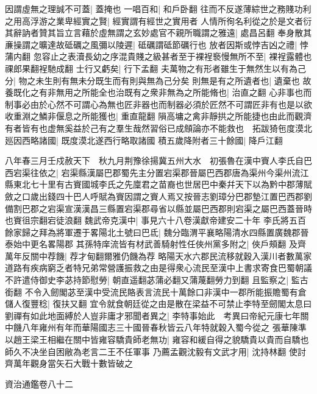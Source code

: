因謂虛無之理誠不可蓋|{
	蓋掩也}
一唱百和|{
	和戶卧翻}
往而不反遂薄綜世之務賤功利之用高浮游之業卑經實之賢|{
	經實謂有經世之實用者}
人情所徇名利從之於是文者衍其辭訥者贊其旨立言藉於虛無謂之玄妙處官不親所職謂之雅遠|{
	處昌呂翻}
奉身散其亷操謂之曠達故砥礪之風彌以陵遲|{
	砥礪謂砥節礪行也}
放者因斯或悖吉凶之禮|{
	悖蒲内翻}
忽容止之表瀆長幼之序混貴賤之級甚者至于裸裎䙝慢無所不至|{
	裸裎露體也祼郎果翻裎馳成翻}
士行又虧矣|{
	行下孟翻}
夫萬物之有形者雖生于無然生以有為己分|{
	物之未生則有無未分既生而有則與無為己分矣}
則無是有之所遺者也|{
	遺棄也}
故養既化之有非無用之所能全也治既有之衆非無為之所能脩也|{
	治直之翻}
心非事也而制事必由於心然不可謂心為無也匠非器也而制器必須於匠然不可謂匠非有也是以欲收重淵之鱗非偃息之所能獲也|{
	重直龍翻}
隕高墉之禽非靜拱之所能捷也由此而觀濟有者皆有也虚無奚益於己有之羣生哉然習俗已成頠論亦不能救也　拓跋猗㐌度漠北廵因西略諸國|{
	既度漠北遂西行略取諸國}
積五歲降附者三十餘國|{
	降戶江翻}


八年春三月壬戍赦天下　秋九月荆豫徐揚冀五州大水　初張魯在漢中賨人李氏自巴西宕渠往依之|{
	宕渠縣漢屬巴郡蜀先主分置宕渠郡晉屬巴西郡唐為渠州今渠州流江縣東北七十里有古賨國城李氏之先廩君之苗裔也世居巴中秦幷天下以為黔中郡薄賦斂之口歲出錢四十巴人呼賦為賨因謂之賨人焉又按晉志劉璋分巴郡墊江置巴西郡劉備割巴郡之宕渠宣漢漢昌三縣置宕渠郡尋省以縣並屬巴西郡則宕渠之屬巴西蓋晉時也賨徂宗翻宕徒浪翻}
魏武帝克漢中|{
	事見六十八卷漢獻帝建安二十年}
李氏將五百餘家歸之拜為將軍遷于畧陽北土號曰巴氐|{
	魏分臨渭平襄略陽清水四縣置廣魏郡晉泰始中更名畧陽郡}
其孫特庠流皆有材武善騎射性任俠州黨多附之|{
	俠戶頰翻}
及齊萬年反關中荐饑|{
	荐才甸翻爾雅仍饑為荐}
略陽天水六郡民流移就穀入漢川者數萬家道路有疾病窮乏者特兄弟常營護振救之由是得衆心流民至漢中上書求寄食巴蜀朝議不許遣侍御史李苾持節慰勞|{
	朝直遥翻苾蒲必翻又蒲蔑翻勞力到翻}
且監察之|{
	監古銜翻}
不令入劒閣苾至漢中受流民賂表言流民十萬餘口非漢中一郡所能振贍蜀有倉儲人復豐稔|{
	復扶又翻}
宜令就食朝廷從之由是散在梁益不可禁止李特至劒閣太息曰劉禪有如此地面縛於人豈非庸才邪聞者異之|{
	李特事始此　考異曰帝紀元康七年關中饑八年雍州有年而華陽國志三十國晉春秋皆云八年特就穀入蜀今從之}
張華陳準以趙王梁王相繼在關中皆雍容驕貴師老無功|{
	雍容和緩自得之貌驕貴以貴而自驕也師久不决坐自困敝為老言二王不任軍事}
乃薦孟觀沈毅有文武才用|{
	沈持林翻}
使討齊萬年觀身當矢石大戰十數皆破之

資治通鑑卷八十二
